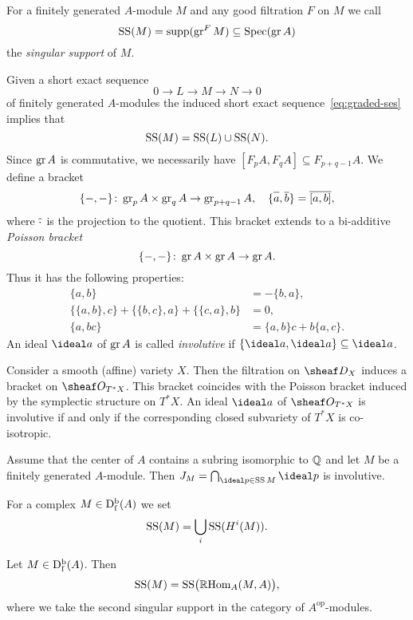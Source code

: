 \documentclass[number-in-sections,a4paper]{notes}
\begin{document}
\begin{Definition}
    For a finitely generated $A$-module $M$ and any good filtration $F$ on $M$ we call
    \[
        \operatorname{SS}(M) = \operatorname{supp}(\operatorname{gr}^F M) \subseteq \operatorname{Spec}(\operatorname{gr} A)
    \]
    the \emph{singular support} of $M$.
\end{Definition}

Given a short exact sequence
\[
    0 \to L \to M \to N \to 0
\]
of finitely generated $A$-modules the induced short exact sequence~\eqref{eq:graded-ses} implies that
\[
    \operatorname{SS}(M) = \operatorname{SS}(L) \cup \operatorname{SS}(N).
\]
Since $\operatorname{gr} A$ is commutative, we necessarily have $[F_pA, F_qA] \subseteq F_{p+q-1}A$.
We define a bracket 
\[
    \{-,-\}\colon \operatorname{gr}_p A \times \operatorname{gr}_q A \to \operatorname{gr}_{p+q-1} A, \quad \{ \overline{\vphantom{b}a}, \overline b\} = \overline{[a,b]},
\]
where $\overline{\vphantom{x}\cdot}$ is the projection to the quotient.
This bracket extends to a bi-additive \emph{Poisson bracket}
\[
    \{-,-\}\colon \operatorname{gr} A \times \operatorname{gr} A \to \operatorname{gr} A.
\]
Thus it has the following properties:
\begin{align*}
    \{a,b\} &= - \{b,a\}, \\
    \{\{a,b\},c\} + \{\{b,c\},a\} + \{\{c,a\},b\} &= 0, \\
    \{a, bc\} &= \{a,b\}c + b\{a,c\}.
\end{align*}
An ideal $\ideal a$ of $\operatorname{gr} A$ is called \emph{involutive} if $\{\ideal a,\ideal a \} \subseteq \ideal a$.

\begin{Example}\label{ex:poisson-symplectic}
    Consider a smooth (affine) variety $X$.
    Then the filtration on $\sD_X$ induces a bracket on $\sO_{T^*X}$.
    This bracket coincides with the Poisson bracket induced by the symplectic structure on $T^*X$.
    An ideal $\ideal a$ of $\sO_{T^*X}$ is involutive if and only if the corresponding closed subvariety of $T^*X$ is co-isotropic.
\end{Example}

\begin{Theorem}\label{thm:Gabber}
    Assume that the center of $A$ contains a subring isomorphic to ${\mathbb{Q}}$ and let $M$ be a finitely generated $A$-module.
    Then $J_M = \bigcap_{\ideal p \in \SSupp M} \ideal p$ is involutive.
\end{Theorem}

For a complex $M \in \mathrm{D}^{\mathrm{b}}_{\mathrm{f}}(A)$ we set
\[
    \operatorname{SS}(M) = \bigcup_i \operatorname{SS}(H^i(M)).
\]

\begin{Proposition}\label{prop:ss-of-dual}
    Let $M \in \mathrm{D}^{\mathrm{b}}_{\mathrm{f}}(A)$.
    Then 
    \[
        \operatorname{SS}(M) = \operatorname{SS}\bigl(\operatorname{{\mathbb{R}} Hom}_A(M,A)\bigr),
    \]
    where we take the second singular support in the category of $A^{\mathrm{op}}$-modules.
\end{Proposition}
\end{document}
